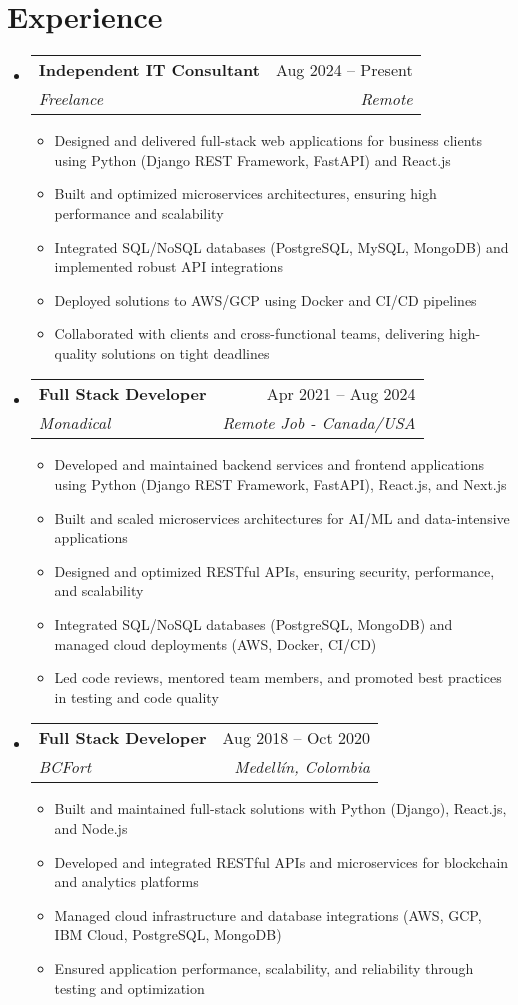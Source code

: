 \documentclass[letterpaper,11pt]{article}
\makeatletter
\newcommand{\resumeSubheading}[4]{
  \vspace{-2pt}
  \item[]
  \begin{tabular*}{\textwidth}{@{\extracolsep{\fill}}l r}
    \textbf{#1} & #2 \\
    \textit{#3} & \textit{#4} \\
  \end{tabular*}
  \vspace{-5pt}
}
\makeatother
\begin{document}
\section{Experience}
\begin{itemize}[leftmargin=0pt, itemindent=0pt, label={}]
\resumeSubheading
{Independent IT Consultant}{Aug 2024 -- Present}
{Freelance}{Remote}
\begin{itemize}[leftmargin=*]
    \item Designed and delivered full-stack web applications for business clients using Python (Django REST Framework, FastAPI) and React.js
    \item Built and optimized microservices architectures, ensuring high performance and scalability
    \item Integrated SQL/NoSQL databases (PostgreSQL, MySQL, MongoDB) and implemented robust API integrations
    \item Deployed solutions to AWS/GCP using Docker and CI/CD pipelines
    \item Collaborated with clients and cross-functional teams, delivering high-quality solutions on tight deadlines
\end{itemize}

\resumeSubheading
{Full Stack Developer}{Apr 2021 -- Aug 2024}
{Monadical}{Remote Job - Canada/USA}
\begin{itemize}[leftmargin=*]
    \item Developed and maintained backend services and frontend applications using Python (Django REST Framework, FastAPI), React.js, and Next.js
    \item Built and scaled microservices architectures for AI/ML and data-intensive applications
    \item Designed and optimized RESTful APIs, ensuring security, performance, and scalability
    \item Integrated SQL/NoSQL databases (PostgreSQL, MongoDB) and managed cloud deployments (AWS, Docker, CI/CD)
    \item Led code reviews, mentored team members, and promoted best practices in testing and code quality
\end{itemize}

\resumeSubheading
{Full Stack Developer}{Aug 2018 -- Oct 2020}
{BCFort}{Medellín, Colombia}
\begin{itemize}[leftmargin=*]
    \item Built and maintained full-stack solutions with Python (Django), React.js, and Node.js
    \item Developed and integrated RESTful APIs and microservices for blockchain and analytics platforms
    \item Managed cloud infrastructure and database integrations (AWS, GCP, IBM Cloud, PostgreSQL, MongoDB)
    \item Ensured application performance, scalability, and reliability through testing and optimization
\end{itemize}


\end{itemize}
\end{document}
